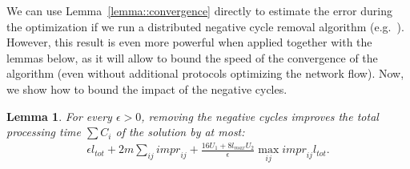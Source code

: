 \documentclass[11pt]{article}
\newcommand{\ltot}{{{l_{\mathit{tot}}}}}
\newcommand{\impr}{{{\mathit{impr}}}}
\newcommand{\lmax}{{{l_{\mathit{max}}}}}
\newtheorem{lemma}[theorem]{Lemma}
\begin{document}
We can use Lemma~\ref{lemma::convergence} directly to estimate the error during the optimization if we run a distributed negative cycle removal algorithm (e.g.~\cite{minimumCirculation, auctionBasedMinCostFlow}).
However, this result is even more powerful  when applied together with the lemmas below, as it will allow to bound the speed of the convergence of the algorithm (even without additional protocols optimizing the network flow).
Now, we show how to bound the impact of the negative cycles.

\begin{lemma}\label{lemma::negativeCyclesElimination}
For every $\epsilon > 0$, removing the negative cycles improves the total processing time $\sum C_{i}$ of the solution by at most:
\begin{align*}
\epsilon \ltot + 2m \sum_{ij} \impr_{ij} + \frac{16U_1 + 8\lmax U_2}{\epsilon} \max_{ij} \impr_{ij} \ltot \text{.}
\end{align*}
\end{lemma}
\end{document}
